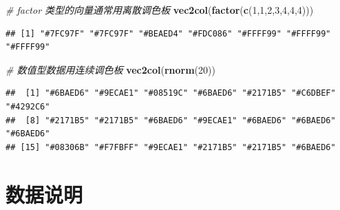 \documentclass[
  b5paper,
  UTF8,twoside]{book}
\newenvironment{Shaded}{\begin{snugshade}}{\end{snugshade}}
\newcommand{\CommentTok}[1]{\textcolor[rgb]{0.56,0.35,0.01}{\textit{#1}}}
\newcommand{\DecValTok}[1]{\textcolor[rgb]{0.00,0.00,0.81}{#1}}
\newcommand{\FunctionTok}[1]{\textcolor[rgb]{0.13,0.29,0.53}{\textbf{#1}}}
\newcommand{\NormalTok}[1]{#1}
\begin{document}
\begin{Shaded}
\begin{Highlighting}[]
\CommentTok{\# factor 类型的向量通常用离散调色板}
\FunctionTok{vec2col}\NormalTok{(}\FunctionTok{factor}\NormalTok{(}\FunctionTok{c}\NormalTok{(}\DecValTok{1}\NormalTok{,}\DecValTok{1}\NormalTok{,}\DecValTok{2}\NormalTok{,}\DecValTok{3}\NormalTok{,}\DecValTok{4}\NormalTok{,}\DecValTok{4}\NormalTok{,}\DecValTok{4}\NormalTok{))) }
\end{Highlighting}
\end{Shaded}

\begin{verbatim}
## [1] "#7FC97F" "#7FC97F" "#BEAED4" "#FDC086" "#FFFF99" "#FFFF99" "#FFFF99"
\end{verbatim}

\begin{Shaded}
\begin{Highlighting}[]
\CommentTok{\# 数值型数据用连续调色板}
\FunctionTok{vec2col}\NormalTok{(}\FunctionTok{rnorm}\NormalTok{(}\DecValTok{20}\NormalTok{))}
\end{Highlighting}
\end{Shaded}

\begin{verbatim}
##  [1] "#6BAED6" "#9ECAE1" "#08519C" "#6BAED6" "#2171B5" "#C6DBEF" "#4292C6"
##  [8] "#2171B5" "#2171B5" "#6BAED6" "#9ECAE1" "#6BAED6" "#6BAED6" "#6BAED6"
## [15] "#08306B" "#F7FBFF" "#9ECAE1" "#2171B5" "#2171B5" "#6BAED6"
\end{verbatim}

\section{数据说明}\label{ux6570ux636eux8bf4ux660e}
\end{document}
